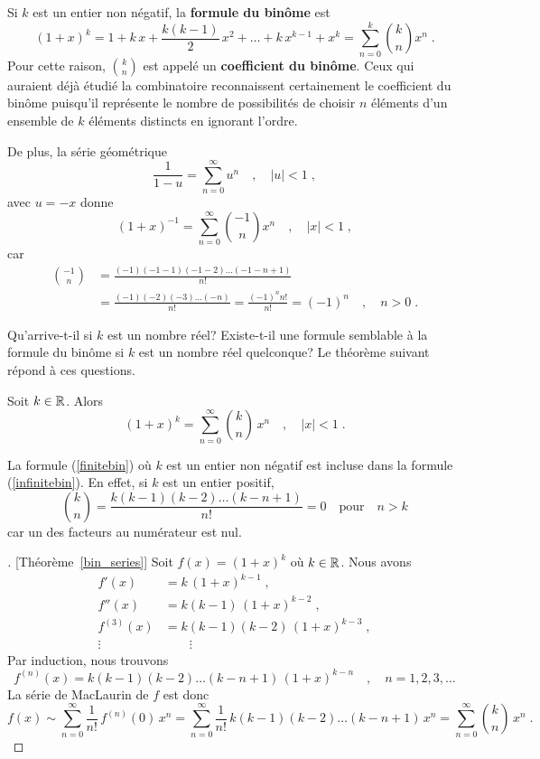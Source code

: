 {Si $k$ est un entier non négatif, la {\bfseries formule du binôme}
 est
\begin{equation}\label{finitebin}
(1+x)^k = 1 + k\,x + \frac{k(k-1)}{2}\,x^2 + \ldots + k\,x^{k-1} + x^k
= \sum_{n=0}^k \binom{k}{n} x^n \; .
\end{equation}
Pour cette raison, $\displaystyle \binom{k}{n}$ est appelé un
{\bfseries coefficient du binôme}.
Ceux qui auraient déjà étudié la combinatoire reconnaissent
certainement le coefficient du binôme puisqu'il représente le nombre
de possibilités de choisir $n$ éléments d'un ensemble de 
$k$ éléments distincts en ignorant l'ordre.

De plus, la série géométrique
\[
\frac{1}{1-u} = \sum_{n=0}^\infty u^n \quad , \quad |u|<1 \; ,
\]
avec $u=-x$ donne
\[
(1+x)^{-1} = \sum_{n=0}^\infty \binom{-1}{n} x^n \quad , \quad |x|<1\; ,
\]
car
\begin{align*}
\binom{-1}{n} &= \frac{(-1)(-1-1)(-1-2)\ldots(-1-n+1)}{n!} \\
&= \frac{(-1)(-2)(-3)\ldots(-n)}{n!} = \frac{(-1)^n n!}{n!} = (-1)^n
\quad , \quad n>0 \;.
\end{align*}

Qu'arrive-t-il si $k$ est un nombre réel?  Existe-t-il une formule semblable
à la formule du binôme si $k$ est un nombre réel quelconque?  Le théorème
suivant répond à ces questions.

\begin{focus}{\thm}\label{bin_series}
Soit $k\in \mathbb{R}$.  Alors
\begin{equation}\label{infinitebin}
(1+x)^k = \sum_{n=0}^\infty \binom{k}{n} \, x^n \quad , \quad |x|<1 \; .
\end{equation}
\end{focus}

\begin{rmk}
La formule (\ref{finitebin}) où $k$ est un entier non négatif est
incluse dans la formule (\ref{infinitebin}).  En effet, si $k$ est un
entier positif,
\[
\binom{k}{n} = \frac{k(k-1)(k-2)\ldots(k-n+1)}{n!} = 0
\quad \text{pour} \quad n > k
\]
car un des facteurs au numérateur est nul.
\end{rmk}

\begin{proof}[\theory][Théorème~\ref{bin_series}]
Soit $f(x)=(1+x)^k$ où $k\in \mathbb{R}$.  Nous avons
\begin{align*}
f'(x) &= k\,(1+x)^{k-1} \; ,\\
f''(x) &= k(k-1)\,(1+x)^{k-2} \; , \\
f^{(3)}(x) &= k(k-1)(k-2)\,(1+x)^{k-3} \; , \\
\vdots & \qquad \vdots
\end{align*}
Par induction, nous trouvons
\[
f^{(n)}(x) = k(k-1)(k-2)\ldots(k-n+1)\,(1+x)^{k-n} \quad , \quad
n=1,2,3,\ldots
\]
La série de MacLaurin de $f$ est donc
\[
f(x) \sim \sum_{n=0}^\infty \frac{1}{n!}\,f^{(n)}(0)\, x^n
= \sum_{n=0}^\infty \frac{1}{n!}\,k(k-1)(k-2)\ldots(k-n+1)\, x^n
= \sum_{n=0}^\infty \binom{k}{n} \, x^n \; .
\]


\end{proof}}
